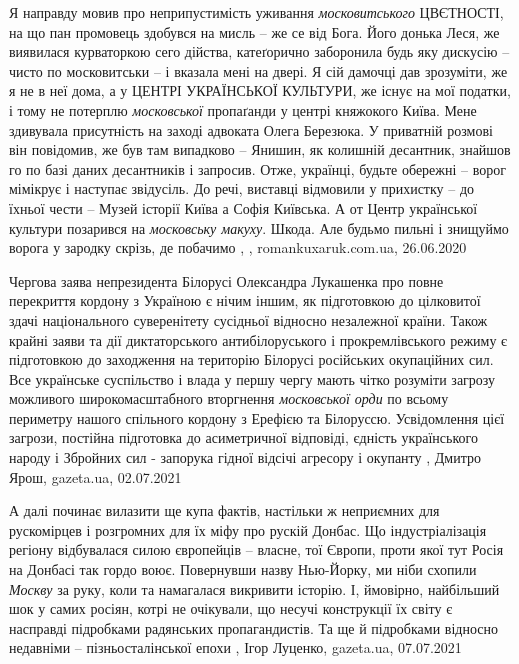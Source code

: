 Я направду мовив про неприпустимість уживання \emph{московитського} ЦВЄТНОСТІ, на що
пан промовець здобувся на мисль – же се від Бога. Його донька Леся, же
виявилася курваторкою сего дійства, катеґорично заборонила будь яку дискусію –
чисто по московитськи – і вказала мені на двері. Я сій дамочці дав зрозуміти,
же я не в неї дома, а у ЦЕНТРІ УКРАЇНСЬКОЇ КУЛЬТУРИ, же існує на мої податки, і
тому не потерплю \emph{московської} пропаґанди у центрі княжокого Київа.  Мене
здивувала присутність на заході адвоката Олега Березюка. У приватній розмові
він повідомив, же був там випадково – Янишин, як колишній десантник, знайшов го
по базі даних десантників і запросив.  Отже, українці, будьте обережні – ворог
мімікрує і наступає звідусіль.  До речі, виставці відмовили у прихистку – до
їхньої чести – Музей історії Київа а Софія Київська. А от Центр української
культури позарився на \emph{московську макуху}.  Шкода.  Але будьмо пильні і знищуймо
ворога у зародку скрізь, де побачимо
, , romankuxaruk.com.ua, 26.06.2020


Чергова заява непрезидента Білорусі Олександра Лукашенка про повне перекриття
кордону з Україною є нічим іншим, як підготовкою до цілковитої здачі
національного суверенітету сусідньої відносно незалежної країни.  Також крайні
заяви та дії диктаторського антибілоруського і прокремлівського режиму є
підготовкою до заходження на територію Білорусі російських окупаційних сил.
Все українське суспільство і влада у першу чергу мають чітко розуміти загрозу
можливого широкомасштабного вторгнення \emph{московської орди} по всьому периметру
нашого спільного кордону з Ерефією та Білоруссю.  Усвідомлення цієї загрози,
постійна підготовка до асиметричної відповіді, єдність українського народу і
Збройних сил - запорука гідної відсічі агресору і окупанту
, 
Дмитро Ярош, gazeta.ua, 02.07.2021

А далі починає вилазити ще купа фактів, настільки ж неприємних для рускомірцев
і розгромних для їх міфу про рускій Донбас. Що індустріалізація регіону
відбувалася силою європейців – власне, тої Європи, проти якої тут Росія на
Донбасі так гордо воює.
Повернувши назву Нью-Йорку, ми ніби схопили \emph{Москву} за руку, коли та намагалася
викривити історію. І, ймовірно, найбільший шок у самих росіян, котрі не
очікували, що несучі конструкції їх світу є насправді підробками радянських
пропагандистів. Та ще й підробками відносно недавніми – пізньосталінської епохи
, 
Ігор Луценко, gazeta.ua, 07.07.2021


